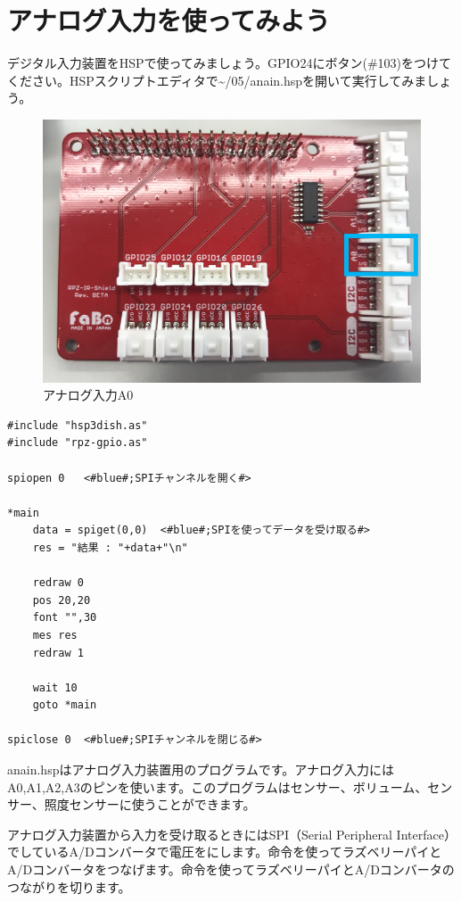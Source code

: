 \newpage
\section{アナログ入力を使ってみよう}
デジタル入力装置をHSPで使ってみましょう。GPIO24にボタン(\#103)をつけてください。HSPスクリプトエディタで\textasciitilde /05/anain.hspを開いて実行してみましょう。\\
\begin{figure}[H]
    \centering
    \includegraphics[scale=0.6]{images/chap05/text05-img030.png}
    \caption{アナログ入力A0}
\end{figure}

\begin{lstlisting}[caption=anain.hsp,label=anain.hsp]
#include "hsp3dish.as"
#include "rpz-gpio.as"

spiopen 0	<#blue#;SPIチャンネルを開く#>

*main
	data = spiget(0,0)	<#blue#;SPIを使ってデータを受け取る#>
	res = "結果 : "+data+"\n"

	redraw 0
	pos 20,20
	font "",30
	mes res
	redraw 1

	wait 10
	goto *main

spiclose 0	<#blue#;SPIチャンネルを閉じる#>
\end{lstlisting}

anain.hspはアナログ入力装置用のプログラムです。アナログ入力にはA0,A1,A2,A3のピンを使います。このプログラムはセンサー、ボリューム、センサー、照度センサーに使うことができます。

アナログ入力装置から入力を受け取るときにはSPI（Serial Peripheral Interface）でしているA/Dコンバータで電圧をにします。命令を使ってラズベリーパイとA/Dコンバータをつなげます。命令を使ってラズベリーパイとA/Dコンバータのつながりを切ります。


